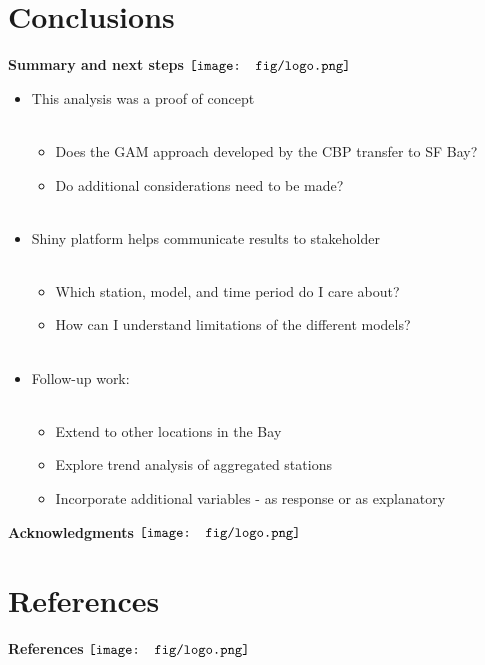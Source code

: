 \documentclass{beamer}
\begin{document}
\section{Conclusions}

\begin{frame}{\textbf{Summary and next steps} \hspace{0pt plus 1 filll} $\vcenter{\hbox{\texttt{[image: fig/logo.png]}}}$}
\begin{itemize}
\item This analysis was a proof of concept \\~\\
\begin{itemize}
\item Does the GAM approach developed by the CBP transfer to SF Bay?
\item Do additional considerations need to be made? \\~\\
\end{itemize}
\item Shiny platform helps communicate results to stakeholder  \\~\\
\begin{itemize}
\item Which station, model, and time period do I care about?
\item How can I understand limitations of the different models? \\~\\
\end{itemize}
\item Follow-up work: \\~\\
\begin{itemize}
\item Extend to other locations in the Bay
\item Explore trend analysis of aggregated stations
\item Incorporate additional variables - as response or as explanatory
\end{itemize}
\end{itemize}
\end{frame}

\begin{frame}{\textbf{Acknowledgments} \hspace{0pt plus 1 filll} $\vcenter{\hbox{\texttt{[image: fig/logo.png]}}}$}

\end{frame}

\section{References}

\begin{frame}[t]{\textbf{References} \hspace{0pt plus 1 filll} $\vcenter{\hbox{\texttt{[image: fig/logo.png]}}}$}
\tiny
{}


\end{frame}
\end{document}
